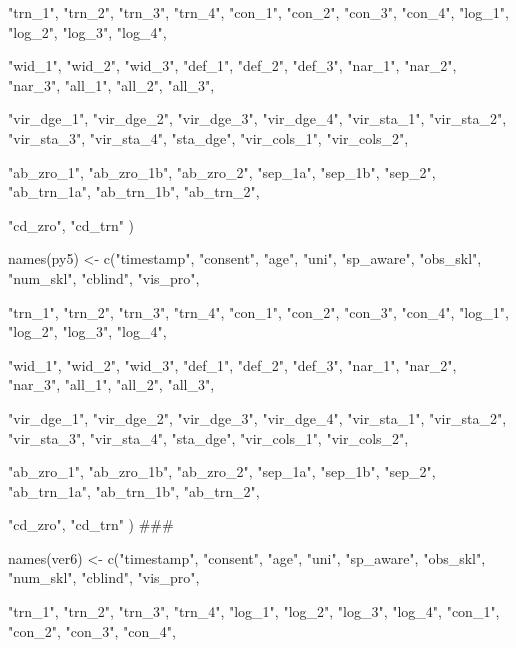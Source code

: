 \documentclass{article}
\begin{document}
                 "trn_1", "trn_2", "trn_3", "trn_4",
                 "con_1", "con_2", "con_3", "con_4",
                 "log_1", "log_2", "log_3", "log_4", 
                 
                 "wid_1", "wid_2", "wid_3",
                 "def_1", "def_2", "def_3", 
                 "nar_1", "nar_2", "nar_3", 
                 "all_1", "all_2", "all_3",
  
                 "vir_dge_1", "vir_dge_2", "vir_dge_3", "vir_dge_4",
                 "vir_sta_1", "vir_sta_2", "vir_sta_3", "vir_sta_4", 
                 "sta_dge",
                 "vir_cols_1", "vir_cols_2", 
  
                 "ab_zro_1", "ab_zro_1b", "ab_zro_2",
                 "sep_1a", "sep_1b", "sep_2",
                 "ab_trn_1a", "ab_trn_1b", "ab_trn_2", 
                 
                 "cd_zro",
                 "cd_trn"
                 )

names(py5) <- c("timestamp", "consent", "age", "uni", "sp_aware", "obs_skl", "num_skl", "cblind", "vis_pro",
                 
                 "trn_1", "trn_2", "trn_3", "trn_4",
                 "con_1", "con_2", "con_3", "con_4",
                 "log_1", "log_2", "log_3", "log_4", 
                 
                 "wid_1", "wid_2", "wid_3",
                 "def_1", "def_2", "def_3", 
                 "nar_1", "nar_2", "nar_3", 
                 "all_1", "all_2", "all_3",
  
                 "vir_dge_1", "vir_dge_2", "vir_dge_3", "vir_dge_4",
                 "vir_sta_1", "vir_sta_2", "vir_sta_3", "vir_sta_4", 
                 "sta_dge",
                 "vir_cols_1", "vir_cols_2", 
  
                 "ab_zro_1", "ab_zro_1b", "ab_zro_2",
                 "sep_1a", "sep_1b", "sep_2",
                 "ab_trn_1a", "ab_trn_1b", "ab_trn_2", 
                 
                 "cd_zro",
                 "cd_trn"
                 )
###

names(ver6) <- c("timestamp", "consent", "age", "uni", "sp_aware", "obs_skl", "num_skl", "cblind", "vis_pro",
                 
                 "trn_1", "trn_2", "trn_3", "trn_4",
                 "log_1", "log_2", "log_3", "log_4", 
                 "con_1", "con_2", "con_3", "con_4",
                 
\end{document}
